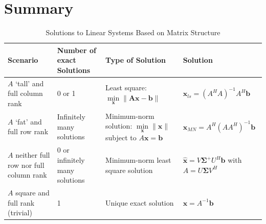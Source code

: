 \section{Summary}
\begin{table}[h]
\centering
\begin{tabular}{ | m{4cm} | m{3cm} | m{4cm} | m{4.5cm} | }
\hline
\textbf{Scenario} & \textbf{Number of exact Solutions} & \textbf{Type of Solution} & \textbf{Solution} \\
\hline
\( A \) ‘tall’ and full column rank & 0 or 1 & Least square: \( \min\limits_{\mathbf{x}} \|\mathbf{Ax} - \mathbf{b}\| \) & \( \mathbf{x}_{ls} = (A^HA)^{-1}A^H\mathbf{b} \) \\
\hline
\( A \) ‘fat’ and full row rank & Infinitely many solutions & Minimum-norm solution: \( \min\limits_{\mathbf{x}} \|\mathbf{x}\| \) subject to \( A\mathbf{x}=\mathbf{b} \) & \( \mathbf{x}_{MN} = A^H(AA^H)^{-1}\mathbf{b} \) \\
\hline
\( A \) neither full row nor full column rank & 0 or infinitely many solutions & Minimum-norm least square solution & \( \mathbf{\hat{x}} = V\mathbf{\Sigma}^+U^H\mathbf{b} \) with \( A = U\mathbf{\Sigma}V^H \) \\
\hline
\( A \) square and full rank (trivial) & 1 & Unique exact solution & \( \mathbf{x} = A^{-1}\mathbf{b} \) \\
\hline
\end{tabular}
\caption{Solutions to Linear Systems Based on Matrix Structure}
\end{table}

